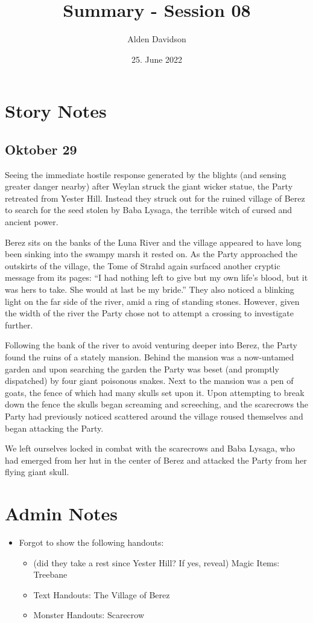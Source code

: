 \documentclass[a4paper,11pt]{article}
\title{Summary - Session 08}
\author{Alden Davidson}
\date{25. June 2022}
\begin{document}
\maketitle

\section{Story Notes}
\subsection{Oktober 29}
Seeing the immediate hostile response generated by the blights (and sensing greater danger nearby) after Weylan 
struck the giant wicker statue, the Party retreated from Yester Hill. Instead they struck out for the ruined village 
of Berez to search for the seed stolen by Baba Lysaga, the terrible witch of cursed and ancient power.

Berez sits on the banks of the Luna River and the village appeared to have long been sinking into the swampy marsh 
it rested on. As the Party approached the outskirts of the village, the Tome of Strahd again surfaced another 
cryptic message from its pages: ``I had nothing left to give but my own life's blood, but it was hers to take. She 
would at last be my bride.'' They also noticed a blinking light on the far side of the river, amid a ring of 
standing stones. However, given the width of the river the Party chose not to attempt a crossing to investigate 
further.

Following the bank of the river to avoid venturing deeper into Berez, the Party found the ruins of a stately 
mansion. Behind the mansion was a now-untamed garden and upon searching the garden the Party was beset (and promptly 
dispatched) by four giant poisonous snakes. Next to the mansion was a pen of goats, the fence of which had many 
skulls set upon it. Upon attempting to break down the fence the skulls began screaming and screeching, and the 
scarecrows the Party had previously noticed scattered around the village roused themselves and began attacking the 
Party.

We left ourselves locked in combat with the scarecrows and Baba Lysaga, who had emerged from her hut in the center 
of Berez and attacked the Party from her flying giant skull.

\section{Admin Notes}
\begin{itemize}
  \item Forgot to show the following handouts:
  \begin{itemize}
    \item (did they take a rest since Yester Hill? If yes, reveal) Magic Items: Treebane
    \item Text Handouts: The Village of Berez
    \item Monster Handouts: Scarecrow
  \end{itemize}
\end{itemize}
\end{document}
